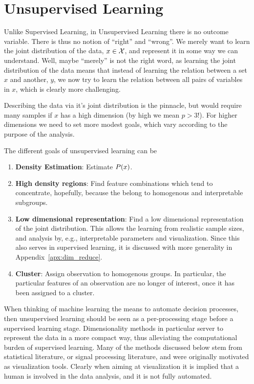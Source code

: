 
\chapter{Unsupervised Learning}

\label{sec:unsupervised}

Unlike Supervised Learning, in Unsupervised Learning there is no outcome variable. 
There is thus no notion of ``right'' and ``wrong''. 
We merely want to learn the joint distribution of the data, $x \in \mathcal{X}$, and represent it in some way we can understand. 
Well, maybe ``merely'' is not the right word, as learning the joint distribution of the data means that instead of learning the relation between a set $x$ and another, $y$, we now try to learn the relation between all pairs of variables in $x$, which is clearly more challenging. 

Describing the data via it's joint distribution is the pinnacle, but would require many samples if $x$ has a high dimension (by high we mean $p>3$!). For higher dimensions we need to set more modest goals, which vary according to the purpose of the analysis.

The different goals of unsupervised learning can be
\begin{enumerate}
\item \textbf{Density Estimation}: Estimate $P(x)$.
\item \textbf{High density regions}: Find feature combinations which tend to concentrate, hopefully, because the belong to homogenous and interpretable subgroups.
\item \textbf{Low dimensional representation}: Find a low dimensional representation of the joint distribution. This allows the learning from realistic sample sizes, and analysis by, e.g., interpretable parameters and visualization.
Since this also serves in supervised learning, it is discussed with more generality in Appendix~\ref{apx:dim_reduce}.
\item \textbf{Cluster}: Assign observation to homogenous groups. In particular, the particular features of an observation are no longer of interest, once it has been assigned to a cluster.
\end{enumerate}


When thinking of machine learning the means to automate decision processes, then unsupervised learning should be seen as a per-processing stage before a supervised learning stage. Dimensionality methods in particular server to represent the data in a more compact way, thus alleviating the computational burden of supervised learning. 
Many of the methods discussed below stem from statistical literature, or signal processing literature, and were originally motivated as visualization tools. Clearly when aiming at visualization it is implied that a human is involved in the data analysis, and it is not fully automated. 


